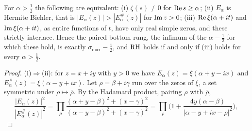 \begin{theorem}\label{mi:thm:paired}
For $\alpha>\frac12$ the following are equivalent: (i) $\zeta(s)\ne0$ for $\operatorname{Re} s\ge\alpha$; (ii) $E_\alpha$ is Hermite Biehler, that is $|E_\alpha(z)|>|E_\alpha^\#(z)|$ for $\operatorname{Im} z>0$; (iii) $\operatorname{Re}\xi(\alpha+it)$ and $\operatorname{Im}\xi(\alpha+it)$, as entire functions of $t$, have only real simple zeros, and these strictly interlace. Hence the paired bottom rung, the infimum of the $\alpha-\frac12$ for which these hold, is exactly $\sigma_{\max}-\frac12$, and $\mathrm{RH}$ holds if and only if (iii) holds for every $\alpha>\frac12$.
\end{theorem}

\begin{proof}
(i)$\Rightarrow$(ii): for $z=x+iy$ with $y>0$ we have $E_\alpha(z)=\xi(\alpha+y-ix)$ and $E_\alpha^\#(z)=\xi(\alpha-y+ix)$. Let $\rho=\beta+i\gamma$ run over the zeros of $\xi$, a set symmetric under $\rho\mapsto\bar\rho$. By the Hadamard product, pairing $\rho$ with $\bar\rho$,
\[
\frac{|E_\alpha(z)|^2}{|E_\alpha^\#(z)|^2}=\prod_\rho\frac{(\alpha+y-\beta)^2+(x-\gamma)^2}{(\alpha-y-\beta)^2+(x-\gamma)^2}=\prod_\rho\Big(1+\frac{4y(\alpha-\beta)}{|\alpha-y+ix-\rho|^2}\Big),
\]

\end{proof}
